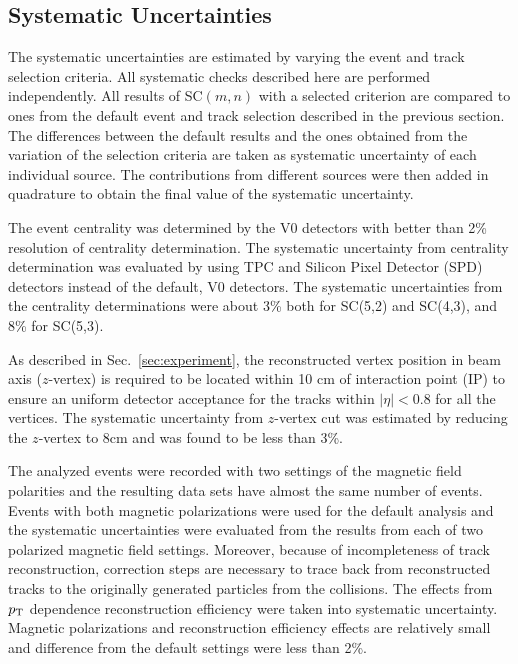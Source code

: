 \documentclass[ALICE,manyauthors]{cernphprep}
\begin{document}
\subsection{Systematic Uncertainties}
\label{sec:uncertainties}



The systematic uncertainties are estimated by varying the event and track selection criteria. All systematic checks described here are performed independently. 
All results of SC$(m,n)$ with a selected criterion are compared to ones from the default event and track selection described in the previous section.
The differences between the default results and the ones obtained from the variation of the selection criteria are taken as systematic uncertainty of each individual source.
The contributions from different sources were then added in quadrature to obtain the final value of the systematic uncertainty.

The event centrality was determined by the V0 detectors \cite{Abbas:2013taa} with better than 2\%  resolution of centrality determination. The systematic uncertainty from centrality determination was evaluated by using TPC and Silicon Pixel Detector (SPD) \cite{Dellacasa:1999kf} detectors instead of the default, V0 detectors. The systematic uncertainties from the centrality determinations were about 3\% both for SC(5,2) and SC(4,3), and 8\% for  SC(5,3).

As described in Sec.~\ref{sec:experiment}, the reconstructed vertex position in beam axis ($z$-vertex) is required to be located within 10 cm of interaction point (IP) to ensure
an uniform detector acceptance for the tracks within $|\eta|<0.8$ for all the vertices. The systematic uncertainty from $z$-vertex cut was estimated by reducing the $z$-vertex to 8cm and was found to be less than 3\%.  

The analyzed events were recorded with two settings of the magnetic field polarities and the resulting data sets have almost the same number of events. Events with both magnetic polarizations were used for the default analysis and the systematic uncertainties were evaluated from the results from each of two polarized magnetic field settings. 
Moreover, because of incompleteness of track reconstruction, correction steps are necessary to trace back from reconstructed tracks to the originally generated particles from the collisions. The effects from $p_{\rm T}$ dependence reconstruction efficiency were taken into systematic uncertainty. Magnetic polarizations and reconstruction efficiency effects are relatively small and difference from the default settings were less than 2\%.
\end{document}
